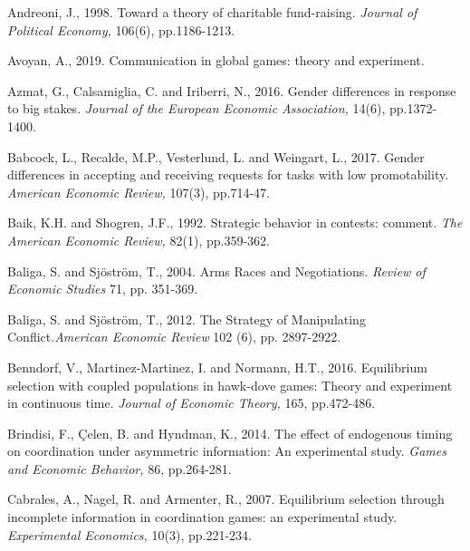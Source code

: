 \documentclass[11pt, letterpaper]{article}
\theoremstyle{plain}
\begin{document}
\newpage
\begin{thebibliography}{10}

\bibitem{} Andreoni, J., 1998. Toward a theory of charitable fund-raising. \textit{Journal of Political Economy,} 106(6), pp.1186-1213.

\bibitem{} Avoyan, A., 2019. Communication in global games: theory and experiment. 

\bibitem{} Azmat, G., Calsamiglia, C. and Iriberri, N., 2016. Gender differences in response to big stakes. \textit{Journal of the European Economic Association,} 14(6), pp.1372-1400.

\bibitem{} Babcock, L., Recalde, M.P., Vesterlund, L. and Weingart, L., 2017. Gender differences in accepting and receiving requests for tasks with low promotability. \textit{American Economic Review,} 107(3), pp.714-47.

\bibitem{} Baik, K.H. and Shogren, J.F., 1992. Strategic behavior in contests: comment. \textit{The American Economic Review,} 82(1), pp.359-362.

  Baliga, S. and Sj\"ostr\"om, T., 2004. Arms Races and Negotiations. \textit{Review of Economic Studies} 71, pp. 351-369.





  Baliga, S. and Sj\"ostr\"om, T., 2012. The Strategy of Manipulating Conflict.\textit{American Economic Review} 102 (6), pp. 2897-2922.

 Benndorf, V., Martinez-Martinez, I. and Normann, H.T., 2016. Equilibrium selection with coupled populations in hawk-dove games: Theory and experiment in continuous time. \textit{Journal of Economic Theory,} 165, pp.472-486.

 Brindisi, F., \c{C}elen, B. and Hyndman, K., 2014. The effect of endogenous timing on coordination under asymmetric information: An experimental study. \textit{Games and Economic Behavior,} 86, pp.264-281.

\bibitem{} Cabrales, A., Nagel, R. and Armenter, R., 2007. Equilibrium selection through incomplete information in coordination games: an experimental study. \textit{Experimental Economics,} 10(3), pp.221-234.


\end{thebibliography}
\end{document}
